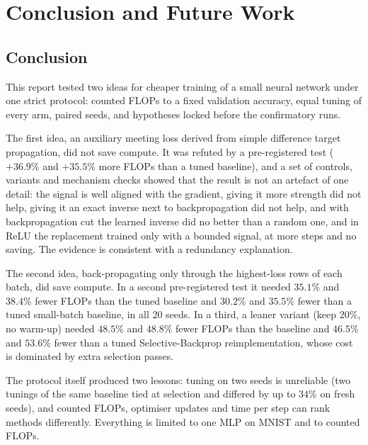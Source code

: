 \chapter{Conclusion and Future Work}\label{ch:conclusion}

\section{Conclusion}
This report tested two ideas for cheaper training of a small neural network under one strict protocol: counted FLOPs to a fixed validation accuracy, equal tuning of every arm, paired seeds, and hypotheses locked before the confirmatory runs.

The first idea, an auxiliary meeting loss derived from simple difference target propagation, did not save compute. It was refuted by a pre-registered test ($+36.9\%$ and $+35.5\%$ more FLOPs than a tuned baseline), and a set of controls, variants and mechanism checks showed that the result is not an artefact of one detail: the signal is well aligned with the gradient, giving it more strength did not help, giving it an exact inverse next to backpropagation did not help, and with backpropagation cut the learned inverse did no better than a random one, and in ReLU the replacement trained only with a bounded signal, at more steps and no saving. The evidence is consistent with a redundancy explanation.

The second idea, back-propagating only through the highest-loss rows of each batch, did save compute. In a second pre-registered test it needed $35.1\%$ and $38.4\%$ fewer FLOPs than the tuned baseline and $30.2\%$ and $35.5\%$ fewer than a tuned small-batch baseline, in all 20 seeds. In a third, a leaner variant (keep $20\%$, no warm-up) needed $48.5\%$ and $48.8\%$ fewer FLOPs than the baseline and $46.5\%$ and $53.6\%$ fewer than a tuned Selective-Backprop reimplementation, whose cost is dominated by extra selection passes.

The protocol itself produced two lessons: tuning on two seeds is unreliable (two tunings of the same baseline tied at selection and differed by up to $34\%$ on fresh seeds), and counted FLOPs, optimiser updates and time per step can rank methods differently. Everything is limited to one MLP on MNIST and to counted FLOPs.

